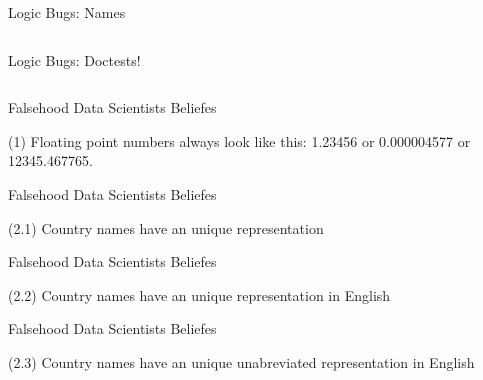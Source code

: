 \documentclass{beamer}
\begin{document}
\begin{frame}{Logic Bugs: Names}
\inputminted[linenos,
             numbersep=7pt,
             fontsize=\footnotesize, tabsize=4,
             firstline=4]{python}{src/sieve-v2.py}
\end{frame}

\begin{frame}{Logic Bugs: Doctests!}
\inputminted[linenos,
               numbersep=7pt,
                fontsize=\footnotesize, tabsize=4,
                firstline=8, lastline=24]{python}{src/sieve-v3.py}
\end{frame}


\begin{frame}{Falsehood Data Scientists Beliefes}
\begin{centering}
(1) Floating point numbers always look like this: 1.23456 or 0.000004577 or 12345.467765.
\end{centering}

\end{frame}

\begin{frame}{Falsehood Data Scientists Beliefes}
\begin{centering}
(2.1) Country names have an unique representation
\end{centering}

\end{frame}

\begin{frame}{Falsehood Data Scientists Beliefes}
\begin{centering}
(2.2) Country names have an unique representation in English
\end{centering}

\end{frame}

\begin{frame}{Falsehood Data Scientists Beliefes}
\begin{centering}
(2.3) Country names have an unique unabreviated representation in English
\end{centering}

\end{frame}
\end{document}
